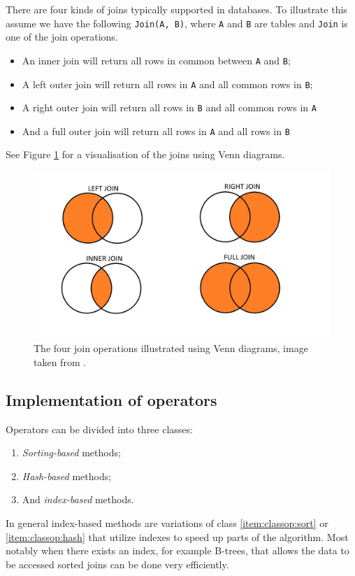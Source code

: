 There are four kinds of joins typically supported in databases. To illustrate this assume we have the following \texttt{Join(A, B)}, where \texttt{A} and \texttt{B} are tables and \texttt{Join} is one of the join operations.
\begin{itemize}
    \item An inner join will return all rows in common between \texttt{A} and \texttt{B};
    \item A left outer join will return all rows in \texttt{A} and all common rows in \texttt{B};
    \item A right outer join will return all rows in \texttt{B} and all common rows in \texttt{A}
    \item And a full outer join will return all rows in \texttt{A} and all rows in \texttt{B}
\end{itemize}
See Figure \ref{fig:vennjoin} for a visualisation of the joins using Venn diagrams.

\begin{figure}[ht]
\includegraphics[scale=0.4]{Images/SQL-Join-Venn-Diagrams.jpg}
\caption[Illustration of join operations using Venn diagrams]{The four join operations illustrated using Venn diagrams, image taken from \cite{brian_2014_better_bqj}.}\label{fig:vennjoin}
\end{figure}

\subsection{Implementation of operators} \label{sec:opimpl}

Operators can be divided into three classes:
\begin{enumerate}
    \item \label{item:classop:sort} \textit{Sorting-based} methods;
    \item \label{item:classop:hash} \textit{Hash-based} methods;
    \item \label{item:classop:index} And \textit{index-based} methods.
\end{enumerate}
In general index-based methods are variations of class \ref{item:classop:sort} or \ref{item:classop:hash} that utilize indexes to speed up parts of the algorithm. Most notably when there exists an index, for example B-trees, that allows the data to be accessed sorted joins can be done very efficiently.

